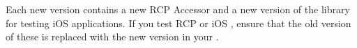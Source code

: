 Each new version  contains a new RCP Accessor and a new version of the library for testing iOS applications. If you test RCP or iOS \gdauts{}, ensure that the old version of these is replaced with the new version in your \gdaut{}.
